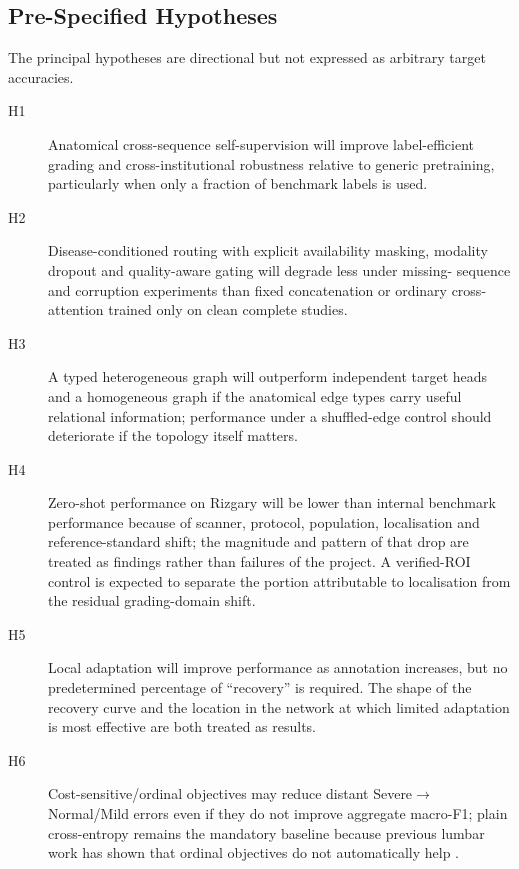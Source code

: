 \subsection{Pre-Specified Hypotheses}
\label{sec:method-hypotheses}

The principal hypotheses are directional but not expressed as arbitrary target
accuracies.

\begin{description}
  \item[H1] Anatomical cross-sequence self-supervision will improve
  label-efficient grading and cross-institutional robustness relative to generic
  pretraining, particularly when only a fraction of benchmark labels is used.

  \item[H2] Disease-conditioned routing with explicit availability masking,
  modality dropout and quality-aware gating will degrade less under missing-
  sequence and corruption experiments than fixed concatenation or ordinary
  cross-attention trained only on clean complete studies.

  \item[H3] A typed heterogeneous graph will outperform independent target heads
  and a homogeneous graph if the anatomical edge types carry useful relational
  information; performance under a shuffled-edge control should deteriorate if
  the topology itself matters.

  \item[H4] Zero-shot performance on Rizgary will be lower than internal
  benchmark performance because of scanner, protocol, population, localisation
  and reference-standard shift; the magnitude and pattern of that drop are
  treated as findings rather than failures of the project. A verified-ROI
  control is expected to separate the portion attributable to localisation from
  the residual grading-domain shift.

  \item[H5] Local adaptation will improve performance as annotation increases,
  but no predetermined percentage of ``recovery'' is required. The shape of the
  recovery curve and the location in the network at which limited adaptation is
  most effective are both treated as results.

  \item[H6] Cost-sensitive/ordinal objectives may reduce distant
  Severe$\rightarrow$Normal/Mild errors even if they do not improve aggregate
  macro-F1; plain cross-entropy remains the mandatory baseline because previous
  lumbar work has shown that ordinal objectives do not automatically help
  \cite{niemeyer2021a}.
\end{description}

